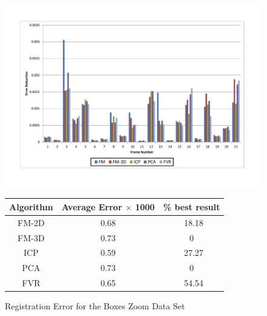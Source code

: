 \begin{figure}
\centering
\includegraphics[width=6in]{images/results/Boxes_Texture_ZoomOut}
\caption{Registration Error for the Boxes Zoom Data Set}
\label{fig:PET3}

\begin{tabular}{ccc}
\hline
\textbf{Algorithm} & \textbf{Average Error $\times$ 1000} & \textbf{\% best result}\\ \hline
FM-2D	& 0.68 & ~18.18\\
FM-3D	& 0.73 & 0\\
ICP		& 0.59 & ~27.27\\
PCA		& 0.73 & 0\\
FVR		& 0.65 & ~54.54\\
\end{tabular}
\label{tab:PET3ST}
\end{figure} 

